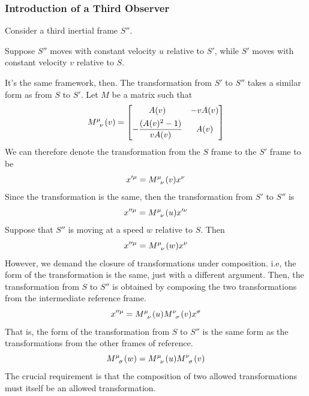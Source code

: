 	\subsubsection{Introduction of a Third Observer}
		\label{subsubsec:3Intro3rdObserver}
		Consider a third inertial frame $S''$.

		Suppose $S''$ moves with constant velocity $u$ relative to $S'$, while $S'$ moves with
		constant velocity $v$ relative to $S$.

		It's the same framework, then. The transformation from $S'$ to $S''$ takes a similar form
		as from $S$ to $S'$. Let $M$ be a matrix such that 
		\begin{equation}
			\tensor{M}{^\mu_\nu}(v) = 
			\bmqty{
				A(v) & -vA(v) \\[4pt]
				- \dfrac{(A(v)^2-1)}{vA(v)} & A(v)
			}
		\end{equation}
		We can therefore denote the transformation from the $S$ frame to the $S'$ frame to be
		\begin{equation}
			x'^\mu = \tensor{M}{^\mu_\nu}(v) x^\nu
		\end{equation}
		Since the transformation is the same, then the transformation from $S'$ to $S''$ is
		\begin{equation}
			x''^\mu = \tensor{M}{^\mu_\nu}(u) x'^\nu
		\end{equation}
		Suppose that $S''$ is moving at a speed $w$ relative to $S$. Then
		\begin{equation}
			x''^\mu = \tensor{M}{^\mu_\nu}(w) x^\nu
		\end{equation}
		However, we demand the closure of transformations under composition. i.e, the form of the transformation is the 
		same, just with a different argument.
		Then, the transformation from $S$ to $S''$ is obtained by composing the two transformations from the intermediate reference
		frame.
		\begin{equation}
			x''^\mu = \tensor{M}{^\mu_\nu}(u)\tensor{M}{^\nu_\sigma}(v) x^\sigma
		\end{equation}
		That is, the form of the transformation from $S$ to $S''$ is the same form as the transformations
		from the other frames of reference.
		\begin{equation}
			\tensor{M}{^\mu_\sigma}(w) = \tensor{M}{^\mu_\nu}(u)\tensor{M}{^\nu_\sigma}(v)
		\end{equation}
		The crucial requirement is that the composition of two allowed transformations must itself be an allowed transformation.

